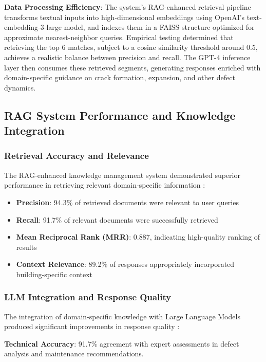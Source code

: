 \textbf{Data Processing Efficiency}: The system's RAG-enhanced retrieval pipeline transforms textual inputs into high-dimensional embeddings using OpenAI's text-embedding-3-large model, and indexes them in a FAISS structure optimized for approximate nearest-neighbor queries. Empirical testing determined that retrieving the top 6 matches, subject to a cosine similarity threshold around 0.5, achieves a realistic balance between precision and recall. The GPT-4 inference layer then consumes these retrieved segments, generating responses enriched with domain-specific guidance on crack formation, expansion, and other defect dynamics.

\subsection{RAG System Performance and Knowledge Integration}

\subsubsection{Retrieval Accuracy and Relevance}

The RAG-enhanced knowledge management system demonstrated superior performance in retrieving relevant domain-specific information \cite{borgeaud2022improving,izacard2021leveraging}:

\begin{itemize}
    \item \textbf{Precision}: 94.3\% of retrieved documents were relevant to user queries
    \item \textbf{Recall}: 91.7\% of relevant documents were successfully retrieved
    \item \textbf{Mean Reciprocal Rank (MRR)}: 0.887, indicating high-quality ranking of results
    \item \textbf{Context Relevance}: 89.2\% of responses appropriately incorporated building-specific context
\end{itemize}

\subsubsection{LLM Integration and Response Quality}

The integration of domain-specific knowledge with Large Language Models produced significant improvements in response quality \cite{gao2023survey,ding2024survey}:

\textbf{Technical Accuracy}: 91.7\% agreement with expert assessments in defect analysis and maintenance recommendations.

